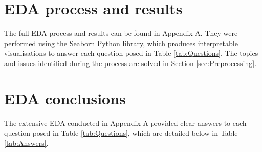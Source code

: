 \documentclass[12pt]{report}
\begin{document}
\section{EDA process and results}
The full EDA process and results can be found in Appendix A. They were performed using the Seaborn Python library,
which produces interpretable visualisations to answer each question posed in Table \ref{tab:Questions}. The topics and issues identified
during the process are solved in Section \ref{sec:Preprocessing}.


\section{EDA conclusions}
The extensive EDA conducted in Appendix A provided clear answers to each question posed in Table \ref{tab:Questions}, 
which are detailed below in Table \ref{tab:Answers}.
\end{document}
